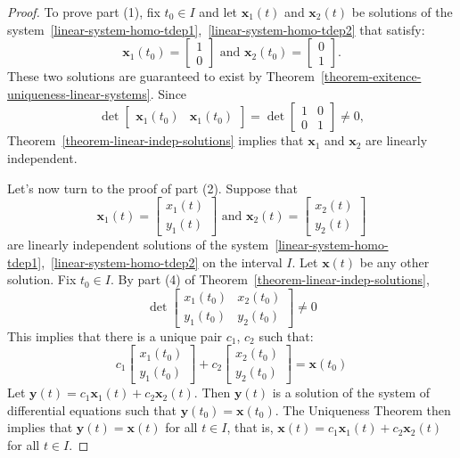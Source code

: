 \begin{proof} To prove part (1), fix $t_0\in I$ and let $\mathbf{x}_1(t)$ and $\mathbf{x}_2(t)$ be solutions of the system~\eqref{linear-system-homo-tdep1},~\eqref{linear-system-homo-tdep2} that satisfy:
\[
\mathbf{x}_1(t_0)=\begin{bmatrix}1\\0\end{bmatrix}\text{ and }
\mathbf{x}_2(t_0)=\begin{bmatrix}0\\1\end{bmatrix}.
\]
These two solutions are guaranteed to exist by Theorem~\ref{theorem-exitence-uniqueness-linear-systems}. Since
\[
\det\begin{bmatrix}\mathbf{x}_1(t_0)&\mathbf{x}_1(t_0)\end{bmatrix}=\det\begin{bmatrix}1&0\\0&1\end{bmatrix}\ne 0,
\]
Theorem~\ref{theorem-linear-indep-solutions} implies that $\mathbf{x}_1$ and $\mathbf{x}_2$ are linearly independent.

Let's now turn to the proof of part (2). Suppose that 
\[
\mathbf{x}_1(t)=\begin{bmatrix}x_1(t)\\y_1(t)\end{bmatrix}\text{ and }
\mathbf{x}_2(t)=\begin{bmatrix}x_2(t)\\y_2(t)\end{bmatrix}
\]
are linearly independent solutions of the system~\eqref{linear-system-homo-tdep1},~\eqref{linear-system-homo-tdep2} on the interval $I$. Let $\mathbf{x}(t)$ be any other solution. Fix $t_0\in I$. By part (4) of Theorem~\ref{theorem-linear-indep-solutions},
\[
\det\begin{bmatrix}x_1(t_0)&x_2(t_0)\\y_1(t_0)&y_2(t_0)\end{bmatrix}\ne0
\]
This implies that there is a unique pair $c_1$, $c_2$ such that:
\[
c_1\begin{bmatrix}x_1(t_0)\\y_1(t_0)\end{bmatrix}+
c_2\begin{bmatrix}x_2(t_0)\\y_2(t_0)\end{bmatrix}=\mathbf{x}(t_0)
\]
Let $\mathbf{y}(t)=c_1\mathbf{x}_1(t)+c_2\mathbf{x}_2(t)$. Then $\mathbf{y}(t)$ is a solution of the system of differential equations such that $\mathbf{y}(t_0)=\mathbf{x}(t_0)$. The Uniqueness Theorem then implies that $\mathbf{y}(t)=\mathbf{x}(t)$ for all $t\in I$, that is, $\mathbf{x}(t)=c_1\mathbf{x}_1(t)+c_2\mathbf{x}_2(t)$ for all $t\in I$.
\end{proof}

